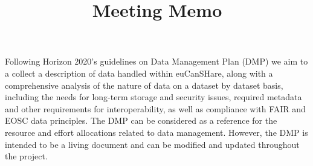 \documentclass{article}
\begin{document}



\title{Meeting Memo}
\date{}





Following Horizon 2020's guidelines on Data Management Plan (DMP) we aim to a collect a description of data handled within euCanSHare, along with a comprehensive analysis of the nature of data on a dataset by dataset basis, including the needs for long-term storage and security issues, required metadata and other requirements for interoperability, as well as compliance with FAIR and EOSC data principles. The DMP can be considered as a reference for the resource and effort allocations related to data management. However, the DMP is intended to be a living document and can be modified and updated throughout the project.\\





\end{document}
